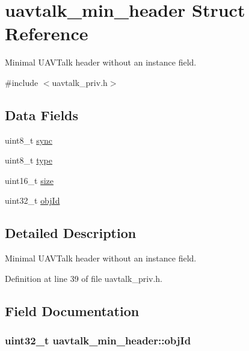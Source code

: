 \hypertarget{structuavtalk__min__header}{\section{uavtalk\-\_\-min\-\_\-header \-Struct \-Reference}
\label{structuavtalk__min__header}
}


\-Minimal \-U\-A\-V\-Talk header without an instance field.  




{\ttfamily \#include $<$uavtalk\-\_\-priv.\-h$>$}

\subsection*{\-Data \-Fields}
\begin{DoxyCompactItemize}
\item 
uint8\-\_\-t \hyperlink{structuavtalk__min__header_a1f264cf34649646db13e6ce6dbf93ef8}{sync}
\item 
uint8\-\_\-t \hyperlink{structuavtalk__min__header_a50b5dda063861e09e6275d4cc108bcd8}{type}
\item 
uint16\-\_\-t \hyperlink{structuavtalk__min__header_a7f75bcff0b29fb58f7ca4640b5be8eb6}{size}
\item 
uint32\-\_\-t \hyperlink{structuavtalk__min__header_a53f2edd4203be08998ea0fbfb09bf7cf}{obj\-Id}
\end{DoxyCompactItemize}


\subsection{\-Detailed \-Description}
\-Minimal \-U\-A\-V\-Talk header without an instance field. 

\-Definition at line 39 of file uavtalk\-\_\-priv.\-h.



\subsection{\-Field \-Documentation}
\hypertarget{structuavtalk__min__header_a53f2edd4203be08998ea0fbfb09bf7cf}{
\subsubsection[{obj\-Id}]{\setlength{\rightskip}{0pt plus 5cm}uint32\-\_\-t {\bf uavtalk\-\_\-min\-\_\-header\-::obj\-Id}}}\label{structuavtalk__min__header_a53f2edd4203be08998ea0fbfb09bf7cf}


